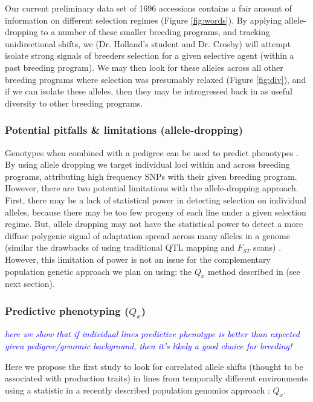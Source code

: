 \documentclass[12pt]{article}
\newcommand{\jri}[1]{\textcolor{blue}{ \emph{\scriptsize  #1}} }
\begin{document}
Our current preliminary data set of 1696 accessions contains a fair amount of information on different selection regimes (Figure \ref{fig:words}). 
By applying allele-dropping to a number of these smaller breeding programs, and tracking unidirectional shifts, we (Dr. Holland's student and Dr. Crosby) will attempt isolate strong signals of breeders selection for a given selective agent (within a past breeding program). 
We may then look for these alleles across all other breeding programs where selection was presumably relaxed (Figure \ref{fig:div}), and if we can isolate these alleles, then they may be introgressed back in as useful diversity to other breeding programs.

\subsubsection*{Potential pitfalls \& limitations (allele-dropping)}
Genotypes when combined with a pedigree can be used to predict phenotypes \citep{de2009predicting,crossa2010prediction,Decker:2012kd}.
By using allele dropping we target individual loci within and across breeding programs, attributing high frequency SNPs with their given breeding program. 
However, there are two potential limitations with the allele-dropping approach. First, there may be a lack of statistical power in detecting selection on individual alleles, because there may be too few progeny of each line under a given selection regime. 
But, allele dropping may not have the statistical power to detect a more diffuse polygenic signal of adaptation spread across many alleles in a genome (similar the drawbacks of using traditional QTL mapping and $F_{ST}$ scans) \cite{Rockman:2011ej, Berg:2014bs}. 
However, this limitation of power is not an issue for the complementary population genetic approach we plan on using: the $Q_{x}$ method described in \cite{Berg:2014bs} (see next section). 

\subsubsection*{Predictive phenotyping ($Q_{x}$)}
\jri{here we show that if individual lines predictive phenotype is better than expected given pedigree/genomic background, then it's likely a good choice for breeding! }

Here we propose the first study to look for correlated allele shifts (thought to be associated with production traits) in lines from temporally different environments using a statistic in a recently described population genomics approach \cite{Berg:2014bs}: $Q_{x}$. 
\end{document}
